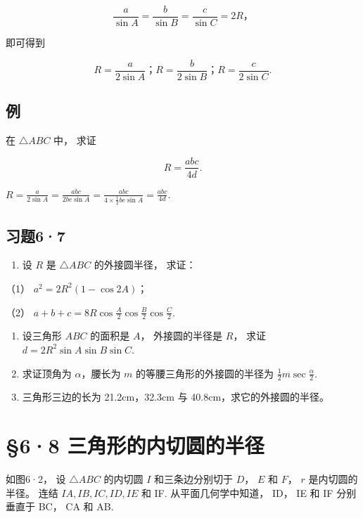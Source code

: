 \[
\frac {a}{\sin A} = \frac {b}{\sin B} = \frac {c}{\sin C} = 2 R\text{，}
\]

即可得到

\[
R = \frac {a}{2 \sin A}\text{；} R = \frac {b}{2 \sin B}\text{；} R = \frac {c}{2 \sin C}.
\]

\subsection{例}

在 \(\triangle ABC\) 中， 求证

\[
R = \frac {a b c}{4 d}.
\]

\(R = \frac{a}{2\sin A} = \frac{abc}{2be\sin A} = \frac{abc}{4\times\frac{1}{2}be\sin A} = \frac{abc}{4d}.\)

\subsection{习题6·7}

\begin{enumerate}
\item
  设 \(R\) 是 \(\triangle ABC\) 的外接圆半径， 求证：
\end{enumerate}

（1） \(a^2 = 2R^2 (1 - \cos 2A)\)；

（2）
\(a + b + c = 8R\cos \frac{A}{2}\cos \frac{B}{2}\cos \frac{C}{2}.\)

\begin{enumerate}[start=2]
\item
  设三角形 \(ABC\) 的面积是 \(A\)， 外接圆的半径是 \(R\)， 求证
  \(d = 2R^2 \sin A \sin B \sin C\).
\item
  求证顶角为 \(\alpha\)，腰长为 \(m\) 的等腰三角形的外接圆的半径为
  \(\frac{1}{2} m \sec \frac{\alpha}{2}\).
\item
  三角形三边的长为 21.2cm，32.3cm 与 40.8cm，求它的外接圆的半径。
\end{enumerate}

\section{§6·8 三角形的内切圆的半径}

如图6·2， 设 \(\triangle ABC\) 的内切圆 \(I\) 和三条边分别切于 \(D\)，
\(E\) 和 \(F\)， \(r\) 是内切圆的半径。 连结 \(IA, IB, IC, ID, IE\) 和
IF. 从平面几何学中知道， ID， IE 和 IF 分别垂直于 BC， CA 和 AB.

